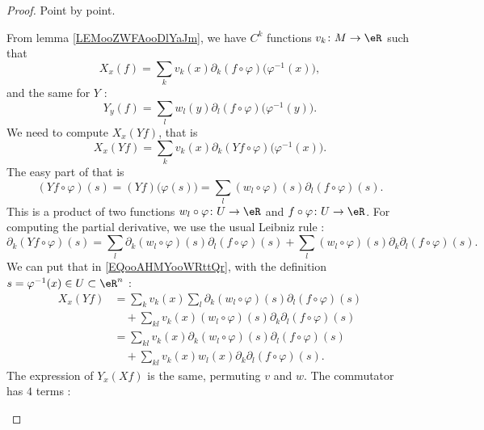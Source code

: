 \begin{proof}
	Point by point.
	\begin{subproof}
		\spitem[\ref{ITEMooZKKUooQjYftU}]
		From lemma \ref{LEMooZWFAooDlYaJm}, we have \( C^k\) functions \( v_k\colon M\to \eR\) such that
		\begin{equation}
			X_x(f)=\sum_kv_k(x)\partial_k(f\circ \varphi)\big( \varphi^{-1}(x) \big),
		\end{equation}
		and the same for \( Y\) :
		\begin{equation}
			Y_y(f)=\sum_lw_l(y)\partial_l(f\circ\varphi)\big( \varphi^{-1}(y) \big).
		\end{equation}
		We need to compute \( X_x(Yf)\), that is
		\begin{equation}        \label{EQooAHMYooWRttQr}
			X_x(Yf)=\sum_kv_k(x)\partial_k(Yf\circ\varphi)\big( \varphi^{-1}(x) \big).
		\end{equation}
		The easy part of that is
		\begin{equation}
			(Yf\circ\varphi)(s)=(Yf)\big( \varphi(s) \big)=\sum_l(w_l\circ\varphi)(s)\partial_l(f\circ \varphi)(s).
		\end{equation}
		This is a product of two functions \( w_l\circ\varphi\colon U\to \eR\) and \( f\circ\varphi\colon U\to \eR\). For computing the partial derivative, we use the usual Leibniz rule :
		\begin{equation}
			\partial_k(Yf\circ\varphi)(s)=\sum_{l}\partial_k(w_l\circ\varphi)(s)\partial_l(f\circ\varphi)(s)+\sum_l(w_l\circ\varphi)(s)\partial_k\partial_l(f\circ\varphi)(s).
		\end{equation}
		We can put that in \eqref{EQooAHMYooWRttQr}, with the definition \( s=\varphi^{-1}(x)\in U\subset \eR^n\) :
		\begin{subequations}
			\begin{align}
				X_x(Yf) & =\sum_kv_k(x)\sum_l\partial_k(w_l\circ\varphi)(s)\partial_l(f\circ\varphi)(s)    \\
				        & \quad +\sum_{kl}v_k(x)(w_l\circ\varphi)(s)\partial_k\partial_l(f\circ\varphi)(s) \\
				        & =\sum_{kl}v_k(x)\partial_k(w_l\circ\varphi)(s)\partial_l(f\circ\varphi)(s)       \\
				        & \quad+\sum_{kl}v_k(x)w_l(x)\partial_k\partial_l(f\circ\varphi)(s).
			\end{align}
		\end{subequations}
		The expression of \( Y_x(Xf)\) is the same, permuting \( v\) and \( w\). The commutator has \( 4\) terms :

\end{subproof}
\end{proof}
